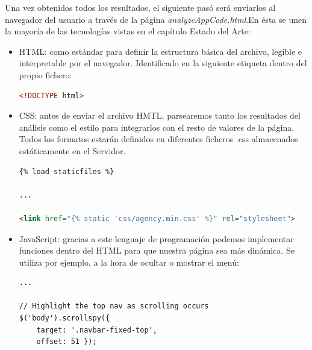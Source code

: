 \documentclass[a4paper, 12pt]{book}
\begin{document}
Una vez obtenidos todos los resultados, el siguiente pasó será enviarlos al navegador del usuario a través de la página \textit{analyzeAppCode.html}.En ésta se unen la mayoría de las tecnologías vistas en el capítulo Estado del Arte:
\begin{itemize}
	\item HTML: como estándar para definir la estructura básica del archivo, legible e interpretable por el navegador. Identificado en la siguiente etiqueta dentro del propio fichero:	
		\begin{lstlisting}[language=HTML]
<!DOCTYPE html>
		\end{lstlisting}
	\item CSS: antes de enviar el archivo HMTL, parsearemos tanto los resultados del análisis como el estilo para integrarlos con el resto de valores de la página. Todos los formatos estarán definidos en diferentes ficheros .css almacenados estáticamente en el Servidor.  
		\begin{lstlisting}[language=HTML]
{% load staticfiles %}

...

<link href="{% static 'css/agency.min.css' %}" rel="stylesheet">
		\end{lstlisting}
	\item JavaScript: gracias a este lenguaje de programación podemos implementar funciones dentro del HTML para que nuestra página sea más dinámica. Se utiliza por ejemplo, a la hora de ocultar o mostrar el menú:
	\begin{lstlisting}[language=HTML]
... 

// Highlight the top nav as scrolling occurs
$('body').scrollspy({
	target: '.navbar-fixed-top',
	offset: 51 });


\end{lstlisting}
\end{itemize}
\end{document}
